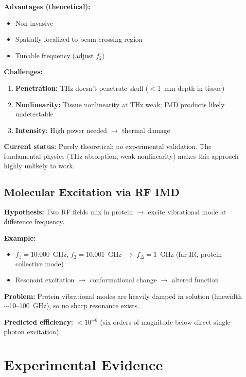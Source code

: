 \textbf{Advantages (theoretical):}
\begin{itemize}
\item Non-invasive
\item Spatially localized to beam crossing region
\item Tunable frequency (adjust $f_2$)
\end{itemize}

\textbf{Challenges:}
\begin{enumerate}
\item \textbf{Penetration:} THz doesn't penetrate skull ($<$1~mm depth in tissue)
\item \textbf{Nonlinearity:} Tissue nonlinearity at THz weak; IMD products likely undetectable
\item \textbf{Intensity:} High power needed $\rightarrow$ thermal damage
\end{enumerate}

\begin{warningbox}
\textbf{Current status:} Purely theoretical; no experimental validation. The fundamental physics (THz absorption, weak nonlinearity) makes this approach highly unlikely to work.
\end{warningbox}

\subsection{Molecular Excitation via RF IMD}

\textbf{Hypothesis:} Two RF fields mix in protein $\rightarrow$ excite vibrational mode at difference frequency.

\textbf{Example:}
\begin{itemize}
\item $f_1 = 10.000$~GHz, $f_2 = 10.001$~GHz $\rightarrow$ $f_{\Delta} = 1$~GHz (far-IR, protein collective mode)
\item Resonant excitation $\rightarrow$ conformational change $\rightarrow$ altered function
\end{itemize}

\textbf{Problem:} Protein vibrational modes are heavily damped in solution (linewidth $\sim$10--100~GHz), so no sharp resonance exists.

\textbf{Predicted efficiency:} $<10^{-6}$ (six orders of magnitude below direct single-photon excitation).

\section{Experimental Evidence}

